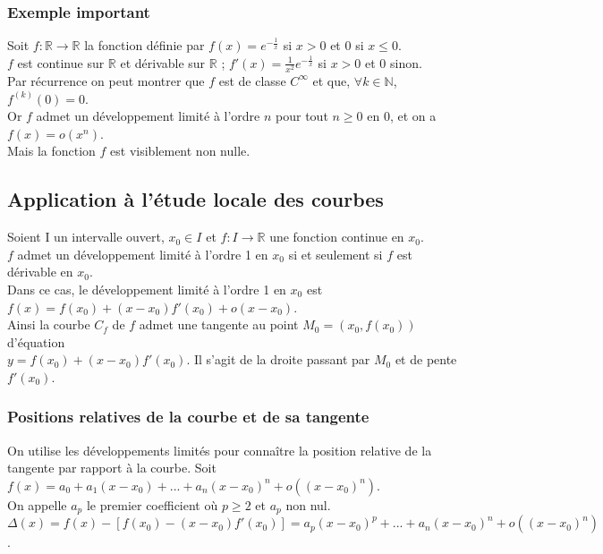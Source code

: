 \documentclass[a4paper,10pt]{book} %
\newcommand{\R}{\mathbb{R}}
\newcommand{\N}{\mathbb{N}}
\newcommand{\dl}{développement limité }
\newcommand{\dls}{développements limités }
\begin{document}
\subsubsection{Exemple important}
Soit $f:\R\rightarrow \R$ la fonction définie par $f(x)=e^{-\frac{1}{x}}$ si $x>0$ et 0 si $x\leq 0$.\\

$f$ est continue sur $\R$ et dérivable sur $\R$ ; $f'(x)=\frac{1}{x^2}e^{-\frac{1}{x}}$ si $x>0$ et 0 sinon.\\

Par récurrence on peut montrer que $f$ est de classe $C^\infty$ et que, $\forall k\in \N$, $f^{(k)}(0)=0$.\\
Or $f$ admet un \dl à l'ordre $n$ pour tout $n\geq 0$ en 0, et on a $f(x)=o(x^n)$.\\

Mais la fonction $f$ est visiblement non nulle.

\newpage

\subsection{Application à l'étude locale des courbes}
Soient I un intervalle ouvert, $x_0 \in I$ et $f:I\rightarrow \R$ une fonction continue en $x_0$.\\
$f$ admet un \dl à l'ordre 1 en $x_0$ si et seulement si $f$ est dérivable en $x_0$.\\

Dans ce cas, le \dl à l'ordre 1 en $x_0$ est $f(x)=f(x_0)+(x-x_0)f'(x_0)+o(x-x_0)$.\\

Ainsi la courbe $C_f$ de $f$ admet une tangente au point $M_0=(x_0,f(x_0))$ d'équation\\
$y=f(x_0)+(x-x_0)f'(x_0)$.
Il s'agit de la droite passant par $M_0$ et de pente $f'(x_0)$.\\


\subsubsection{Positions relatives de la courbe et de sa tangente}
On utilise les \dls pour connaître la position relative de la tangente par rapport à la courbe. Soit  $f(x)=a_0+a_1(x-x_0)+...+a_n(x-x_0)^n+o((x-x_0)^n)$.\\
On appelle $a_p$ le premier coefficient où $p\geq 2$ et $a_p$ non nul.\\
$\Delta(x)=f(x)-\left[f(x_0)-(x-x_0)f'(x_0)\right]=a_p(x-x_0)^p+...+a_n(x-x_0)^n+o((x-x_0)^n)$.\\
\end{document}
